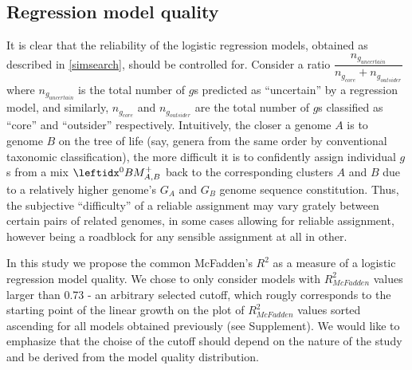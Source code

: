\subsection{Regression model quality}
\label{regmodqual}
It is clear that the reliability of the logistic regression models, obtained
as described in \ref{simsearch}, should be controlled for. Consider a ratio
$\dfrac{n_{g_{uncertain}}}{n_{g_{core}}+n_{g_{outsider}}}$ where
$n_{g_{uncertain}}$ is the total number of $g$s predicted as ``uncertain'' by a
regression model, and similarly, $n_{g_{core}}$ and $n_{g_{outsider}}$ are the
total number of $g$s classified as ``core'' and ``outsider'' respectively.
Intuitively, the closer a genome $A$ is to genome $B$ on the tree of life (say,
genera from the same order by conventional taxonomic classification), the more
difficult it is to confidently assign individual $g$s from a mix $\bmzpab$ back
to the corresponding clusters $A$ and $B$ due to a relatively higher genome's
$G_A$ and $G_B$ genome sequence constitution. Thus, the subjective
``difficulty'' of a reliable assignment may vary grately between certain pairs
of related genomes, in some cases allowing for reliable assignment, however
being a roadblock for any sensible assignment at all in other.

In this study we propose the common McFadden's $R^2$ \cite{McFadden1974} as a
measure of a logistic regression model quality. We chose to only consider
models with $R_{McFadden}^2$ values larger than 0.73 - an arbitrary selected
cutoff, which rougly corresponds to the starting point of the linear growth on
the plot of $R_{McFadden}^2$ values sorted ascending for all models obtained
previously (see Supplement). We would like to emphasize that the choise of the
cutoff should depend on the nature of the study and be derived from the model
quality distribution.
